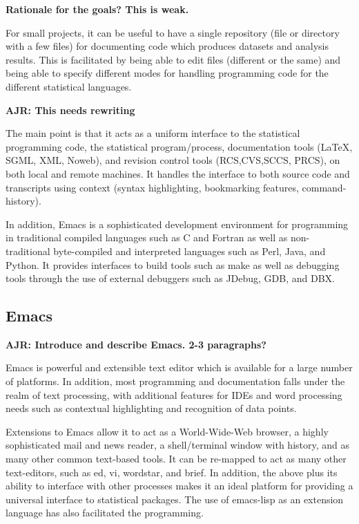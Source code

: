 \documentclass{article}
\begin{document}
\textbf{Rationale for the goals?  This is weak.}

For small projects, it can be useful to have a single repository (file
or directory with a few files) for documenting code which produces
datasets and analysis results.  This is facilitated by being able to
edit files (different or the same) and being able to specify different
modes for handling programming code for the different statistical
languages.

\textbf{AJR: This needs rewriting} 

The main point is that it acts as a uniform interface to the
statistical programming code, the statistical program/process,
documentation tools (\LaTeX, SGML, XML, Noweb), and revision control
tools (RCS,CVS,SCCS, PRCS), on both local and remote machines.  It
handles the interface to both source code and transcripts using
context (syntax highlighting, bookmarking features, command-history).

In addition, Emacs is a sophisticated development environment for
programming in traditional compiled languages such as C and Fortran as
well as non-traditional byte-compiled and interpreted languages such
as Perl, Java, and Python.  It provides interfaces to build tools such
as make as well as debugging tools through the use of external
debuggers such as JDebug, GDB, and DBX. 

\subsection{Emacs}
\label{sec:intro:emacs}

\textbf{AJR: Introduce and describe Emacs.  2-3 paragraphs?} 

Emacs is powerful and extensible text editor which is
available for a large number of platforms.  In addition, most
programming and documentation falls under the realm of text
processing, with additional features for IDEs and word processing
needs such as contextual highlighting and recognition of data points.

Extensions to Emacs allow it to act as a World-Wide-Web browser, a
highly sophisticated mail and news reader, a shell/terminal window
with history, and as many other common text-based tools.  It can be
re-mapped to act as many other text-editors, such as ed, vi, wordstar,
and brief.  In addition, the above plus its ability to interface with
other processes makes it an ideal platform for providing a universal
interface to statistical packages.  The use of emacs-lisp as an
extension language has also facilitated the programming.
\end{document}
